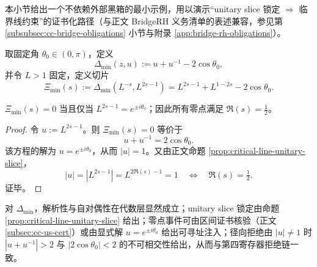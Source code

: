 本小节给出一个不依赖外部黑箱的最小示例，用以演示“unitary slice 锁定 $\Rightarrow$ 临界线约束”的证书化路径（与正文 BridgeRH 义务清单的表述兼容，参见第 \ref{subsubsec:cc-bridge-obligations} 小节与附录 \ref{app:bridge-rh-obligations}）。

\begin{definition}[最小相位桥接核]\label{def:app29-delta-min}
取固定角 $\theta_0\in(0,\pi)$，定义
$$
\Delta_{\min}(z,u):=u+u^{-1}-2\cos\theta_0,
$$
并令 $L>1$ 固定，定义切片
$$
\Xi_{\min}(s):=\Delta_{\min}(L^{-s},L^{2s-1})
=L^{2s-1}+L^{1-2s}-2\cos\theta_0.
$$
\end{definition}

\begin{theorem}[最小示例的临界线零点性]\label{thm:app29-min-critical}
$\Xi_{\min}(s)=0$ 当且仅当 $L^{2s-1}=e^{\pm i\theta_0}$；因此所有零点满足 $\Re(s)=\tfrac12$。
\end{theorem}

\begin{proof}
令 $u:=L^{2s-1}$。则 $\Xi_{\min}(s)=0$ 等价于
$$
u+u^{-1}=2\cos\theta_0.
$$
该方程的解为 $u=e^{\pm i\theta_0}$，从而 $|u|=1$。又由正文命题 \ref{prop:critical-line-unitary-slice}，
$$
|u|=|L^{2s-1}|=L^{2\Re(s)-1}=1
\quad\Longleftrightarrow\quad
\Re(s)=\tfrac12.
$$
证毕。
\end{proof}

\begin{remark}[义务逐项可核验性（示范）]
对 $\Delta_{\min}$，解析性与自对偶性在代数层显然成立；unitary slice 锁定由命题 \ref{prop:critical-line-unitary-slice} 给出；零点事件可由区间证书核验（正文 \ref{subsec:cc-us-cert}）或由显式解 $u=e^{\pm i\theta_0}$ 给出可寻址注入；径向拒绝由 $|u|\neq 1$ 时 $|u+u^{-1}|>2$ 与 $|2\cos\theta_0|<2$ 的不可相交性给出，从而与第四寄存器拒绝链一致。
\end{remark}

